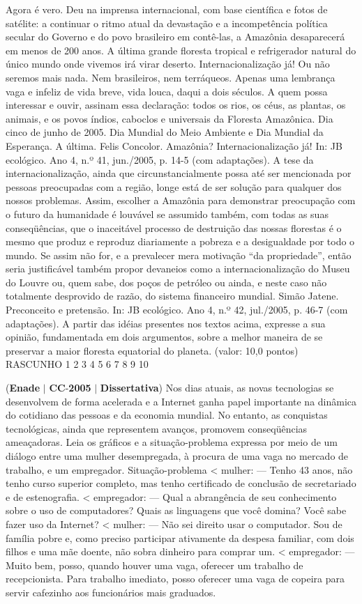 \documentclass{exam}
\begin{document}
\begin{questions}
Agora é vero. Deu na imprensa internacional, com base científica
e fotos de satélite: a continuar o ritmo atual da devastação e a
incompetência política secular do Governo e do povo brasileiro em
contê-las, a Amazônia desaparecerá em menos de 200 anos. A última
grande floresta tropical e refrigerador natural do único mundo onde
vivemos irá virar deserto.
Internacionalização já! Ou não seremos mais nada. Nem
brasileiros, nem terráqueos. Apenas uma lembrança vaga e infeliz de vida
breve, vida louca, daqui a dois séculos.
A quem possa interessar e ouvir, assinam essa declaração: todos
os rios, os céus, as plantas, os animais, e os povos índios, caboclos e
universais da Floresta Amazônica. Dia cinco de junho de 2005.
Dia Mundial do Meio Ambiente e Dia Mundial da Esperança. A última.
Felis Concolor. Amazônia? Internacionalização já! In:
JB ecológico. Ano 4, n.º 41, jun./2005, p. 14-5 (com adaptações).
A tese da internacionalização, ainda que circunstancialmente
possa até ser mencionada por pessoas preocupadas com a região, longe está de ser solução para qualquer dos nossos problemas.
Assim, escolher a Amazônia para demonstrar preocupação com o futuro da humanidade é louvável se assumido também, com
todas as suas conseqüências, que o inaceitável processo de destruição das nossas florestas é o mesmo que produz e reproduz
diariamente a pobreza e a desigualdade por todo o mundo.
Se assim não for, e a prevalecer mera motivação “da propriedade”, então seria justificável também propor devaneios
como a internacionalização do Museu do Louvre ou, quem sabe, dos poços de petróleo ou ainda, e neste caso não totalmente
desprovido de razão, do sistema financeiro mundial.
Simão Jatene. Preconceito e pretensão. In: JB ecológico. Ano 4, n.º 42, jul./2005, p. 46-7 (com adaptações).
A partir das idéias presentes nos textos acima, expresse a sua opinião, fundamentada em dois argumentos, sobre
a melhor maneira de se preservar a maior floresta equatorial do planeta.
(valor: 10,0 pontos)
RASCUNHO
1
2
3
4
5
6
7
8
9
10

\question (\textbf{Enade} $|$ \textbf{CC}-\textbf{2005} $|$ \textbf{Dissertativa})
Nos dias atuais, as novas tecnologias se desenvolvem de forma acelerada e a Internet ganha papel importante
na dinâmica do cotidiano das pessoas e da economia mundial. No entanto, as conquistas tecnológicas, ainda que
representem avanços, promovem conseqüências ameaçadoras.
Leia os gráficos e a situação-problema expressa por meio de um diálogo entre uma mulher desempregada, à procura de uma vaga no
mercado de trabalho, e um empregador.
Situação-problema
< mulher:
— Tenho 43 anos, não tenho curso superior
completo, mas tenho certificado de conclusão de
secretariado e de estenografia.
< empregador:
— Qual a abrangência de seu conhecimento sobre o
uso de computadores? Quais as linguagens que
você domina? Você sabe fazer uso da Internet?
< mulher:
— Não sei direito usar o computador. Sou de
família pobre e, como preciso participar
ativamente da despesa familiar, com dois filhos
e uma mãe doente, não sobra dinheiro para
comprar um.
< empregador:
— Muito bem, posso, quando houver uma vaga,
oferecer um trabalho de recepcionista. Para
trabalho imediato, posso oferecer uma vaga de
copeira para servir cafezinho aos funcionários
mais graduados.


\end{questions}
\end{document}
